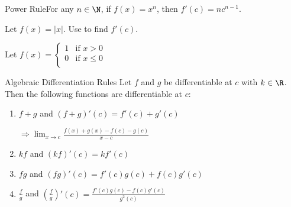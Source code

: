 \begin{ntheorem}
    {Power Rule}For any \(n \in \N\), if \(f(x) = x^{n}\), then \(f'(c) = nc^{n - 1}\).
\end{ntheorem}

\begin{example}
    Let \(f(x) = |x|\). Use  to find \(f'(c)\).
\end{example}


\begin{example}
    Let \(f(x) = \begin{cases}
        1 & \text{if } x > 0 \\
        0 & \text{if } x \leq 0 \\ 
    \end{cases}\)
\end{example}


\begin{ntheorem}
{Algebraic Differentiation Rules} Let \(f\) and \(g\) be differentiable at \(c\) with \(k \in \R\). Then the following functions are differentiable at \(c\):
\begin{enumerate}
    \item \(f + g\) and \((f + g)'(c) = f'(c) + g'(c)\)

    \(\Rightarrow \lim_{x \to c} \frac{f(x) + g(x) - f(c) - g(c)}{x - c}\)
    \item \(kf\) and \((kf)'(c) = kf'(c)\)
    \item \(fg\) and \((fg)'(c) = f'(c)g(c) + f(c)g'(c)\)
    \item \(\frac{f}{g}\) and \(\left(\frac{f}{g}\right)'(c) = \frac{f'(c)g(c) - f(c)g'(c)}{g^{2}(c)}\)
\end{enumerate}
\end{ntheorem}

